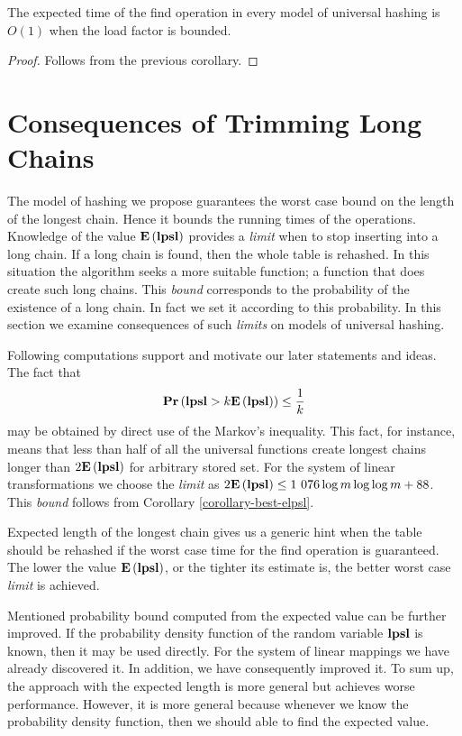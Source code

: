 \begin{corollary}
\label{corollary-find-time}
The expected time of the find operation in every model of universal hashing is $O(1)$ when the load factor is bounded.
\end{corollary}
\begin{proof}
Follows from the previous corollary.
\end{proof}

\section{Consequences of Trimming Long Chains}
The model of hashing we propose guarantees the worst case bound on the length of the longest chain. Hence it bounds the running times of the operations. Knowledge of the value $\mathbf{E}\left(\mathbf{lpsl}\right)$ provides a \emph{limit} when to stop inserting into a long chain. If a long chain is found, then the whole table is rehashed. In this situation the algorithm seeks a more suitable function; a function that does create such long chains. This \emph{bound} corresponds to the probability of the existence of a long chain. In fact we set it according to this probability. In this section we examine consequences of such \emph{limits} on models of universal hashing.

Following computations support and motivate our later statements and ideas. The fact that \[ \mathbf{Pr}\left(\mathbf{lpsl} > k \mathbf{E}\left(\mathbf{lpsl}\right)\right) \leq \frac{1}{k} \] may be obtained by direct use of the Markov's inequality. This fact, for instance, means that less than half of all the universal functions create longest chains longer than $2 \mathbf{E}\left(\mathbf{lpsl}\right)$ for arbitrary stored set. For the system of linear transformations we choose the \emph{limit} as $2\mathbf{E}\left(\mathbf{lpsl}\right) \leq \text{1 076} \log m \log \log m + 88$. This \emph{bound} follows from Corollary \ref{corollary-best-elpsl}.

Expected length of the longest chain gives us a generic hint when the table should be rehashed if the worst case time for the find operation is guaranteed. The lower the value $\mathbf{E}\left(\mathbf{lpsl}\right)$, or the tighter its estimate is, the better worst case \emph{limit} is achieved.

Mentioned probability bound computed from the expected value can be further improved. If the probability density function of the random variable $\mathbf{lpsl}$ is known, then it may be used directly. For the system of linear mappings we have already discovered it. In addition, we have consequently improved it. To sum up, the approach with the expected length is more general but achieves worse performance. However, it is more general because whenever we know the probability density function, then we should able to find the expected value.

